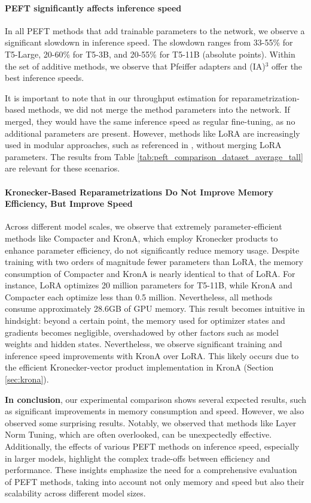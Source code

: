 \paragraph{PEFT significantly affects inference speed}

In all PEFT methods that add trainable parameters to the network, we observe a significant slowdown in inference speed. The slowdown ranges from 33-55\% for T5-Large, 20-60\% for T5-3B, and 20-55\% for T5-11B (absolute points). Within the set of additive methods, we observe that Pfeiffer adapters and (IA)$^3$ offer the best inference speeds. 

It is important to note that in our throughput estimation for reparametrization-based methods, we did not merge the method parameters into the network. If merged, they would have the same inference speed as regular fine-tuning, as no additional parameters are present. However, methods like LoRA are increasingly used in modular approaches, such as referenced in \citep{lorahub}, without merging LoRA parameters. The results from Table \ref{tab:peft_comparison_dataset_average_tall} are relevant for these scenarios.

\paragraph{Kronecker-Based Reparametrizations Do Not Improve Memory Efficiency, But Improve Speed}

Across different model scales, we observe that extremely parameter-efficient methods like Compacter and KronA, which employ Kronecker products to enhance parameter efficiency, do not significantly reduce memory usage. Despite training with two orders of magnitude fewer parameters than LoRA, the memory consumption of Compacter and KronA is nearly identical to that of LoRA. For instance, LoRA optimizes 20 million parameters for T5-11B, while KronA and Compacter each optimize less than 0.5 million. Nevertheless, all methods consume approximately 28.6GB of GPU memory. This result becomes intuitive in hindsight: beyond a certain point, the memory used for optimizer states and gradients becomes negligible, overshadowed by other factors such as model weights and hidden states. Nevertheless, we observe significant training and inference speed improvements with KronA over LoRA. This likely occurs due to the efficient Kronecker-vector product implementation in KronA (Section \ref{sec:krona}).

\textbf{In conclusion}, our experimental comparison shows several expected results, such as significant improvements in memory consumption and speed. However, we also observed some surprising results. Notably, we observed that methods like Layer Norm Tuning, which are often overlooked, can be unexpectedly effective. Additionally, the effects of various PEFT methods on inference speed, especially in larger models, highlight the complex trade-offs between efficiency and performance. These insights emphasize the need for a comprehensive evaluation of PEFT methods, taking into account not only memory and speed but also their scalability across different model sizes.

